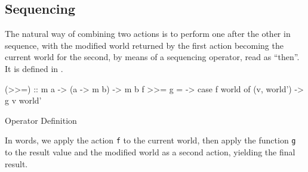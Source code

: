 \subsection{Sequencing}\label{subsec:Sequencing}
The natural way of combining two actions is to perform one after the other in sequence, with the modified world returned by the first action becoming the current world for the second, by means of a sequencing operator, read as ``then''.
It is defined in .

\begin{listing}[h!tbp]
\begin{haskellsource}
(>>=) :: m a -> (a -> m b) -> m b
f >>= g = \world -> case f world of
                         (v, world') -> g v world'
\end{haskellsource}
\caption{\haskellinline{>>=} Operator Definition}
\label{lst:Then_Operator_Definition}
\end{listing}

In words, we apply the action \texttt{f} to the current world, then apply the function \texttt{g} to the result value and the modified world as a second action, yielding the final result.


